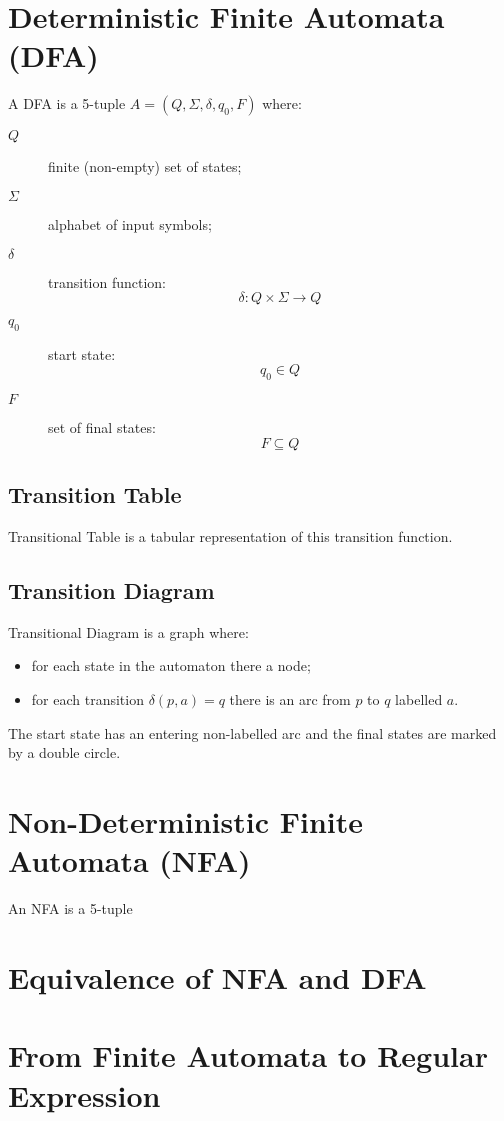 \section{Deterministic Finite Automata (DFA)}
A DFA is a 5-tuple $A = (Q, \Sigma, \delta, q_0, F)$ where:
\begin{description}
	\item[$Q$] finite (non-empty) set of states;
	\item[$\Sigma$] alphabet of input symbols;
	\item[$\delta$] transition function:
		$$
			\delta: Q \times \Sigma \to Q
		$$
	\item[$q_0$] start state:
		$$
			q_0 \in Q
		$$
	\item[$F$] set of final states:
		$$
			F \subseteq Q
		$$
\end{description}

\subsection{Transition Table}
Transitional Table is a tabular representation of this transition function.

\subsection{Transition Diagram}
Transitional Diagram is a graph where:
\begin{itemize}
	\item for each state in the automaton there a node;
	\item for each transition $\delta(p, a) = q$ there is an arc from $p$ to $q$ labelled $a$.
\end{itemize}
The start state has an entering non-labelled arc and the final states are marked by a double circle.

\section{Non-Deterministic Finite Automata (NFA)}
An NFA is a 5-tuple 

\section{Equivalence of NFA and DFA}

\section{From Finite Automata to Regular Expression}